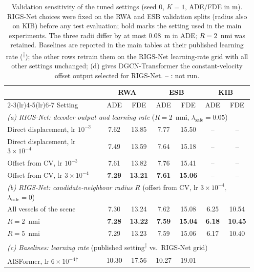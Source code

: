 \begin{table}[t]
\centering
\caption{Validation sensitivity of the tuned settings (seed 0, $K=1$, ADE/FDE in m). RIGS-Net choices were fixed on the RWA and ESB validation splits (radius also on KIB) before any test evaluation; bold marks the setting used in the main experiments. The three radii differ by at most 0.08~m in ADE; $R=2$~nmi was retained. Baselines are reported in the main tables at their published learning rate (\textsuperscript{$\dagger$}); the other rows retrain them on the RIGS-Net learning-rate grid with all other settings unchanged; (d) gives DGCN-Transformer the constant-velocity offset output selected for RIGS-Net. -- : not run.}
\label{tab:tuning_sensitivity}
\footnotesize
\setlength{\tabcolsep}{5pt}
\begin{tabular}{lcccccc}
\toprule
& \multicolumn{2}{c}{RWA} & \multicolumn{2}{c}{ESB} & \multicolumn{2}{c}{KIB} \\
\cmidrule(lr){2-3}\cmidrule(lr){4-5}\cmidrule(lr){6-7}
Setting & ADE & FDE & ADE & FDE & ADE & FDE \\
\midrule
\multicolumn{7}{l}{\textit{(a) RIGS-Net: decoder output and learning rate} ($R=2$~nmi, $\lambda_{\mathrm{safe}}=0.05$)} \\
Direct displacement, lr $10^{-3}$ & 7.62 & 13.85 & 7.77 & 15.50 & -- & -- \\
Direct displacement, lr $3\times10^{-4}$ & 7.49 & 13.59 & 7.64 & 15.18 & -- & -- \\
Offset from CV, lr $10^{-3}$ & 7.61 & 13.82 & 7.76 & 15.41 & -- & -- \\
Offset from CV, lr $3\times10^{-4}$ & \textbf{7.29} & \textbf{13.21} & \textbf{7.61} & \textbf{15.06} & -- & -- \\
\midrule
\multicolumn{7}{l}{\textit{(b) RIGS-Net: candidate-neighbour radius $R$} (offset from CV, lr $3\times10^{-4}$, $\lambda_{\mathrm{safe}}=0$)} \\
All vessels of the scene & 7.30 & 13.24 & 7.62 & 15.08 & 6.25 & 10.54 \\
$R=2$~nmi & \textbf{7.28} & \textbf{13.22} & \textbf{7.59} & \textbf{15.04} & \textbf{6.18} & \textbf{10.45} \\
$R=5$~nmi & 7.29 & 13.23 & 7.59 & 15.06 & 6.17 & 10.40 \\
\midrule
\multicolumn{7}{l}{\textit{(c) Baselines: learning rate} (published setting\textsuperscript{$\dagger$} vs.\ RIGS-Net grid)} \\
AISFormer, lr $6\times10^{-4}$\textsuperscript{$\dagger$} & 10.30 & 17.56 & 10.27 & 19.01 & -- & -- \\

\end{tabular}
\end{table}
